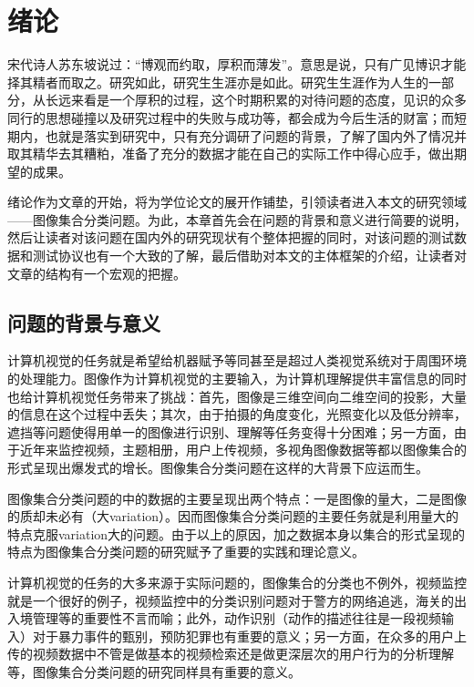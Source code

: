 \chapter{绪\hspace{1em}论}
\label{cha:intro}
宋代诗人苏东坡说过：“博观而约取，厚积而薄发”。意思是说，只有广见博识才能择其精者而取之。研究如此，研究生生涯亦是如此。研究生生涯作为人生的一部分，从长远来看是一个厚积的过程，这个时期积累的对待问题的态度，见识的众多同行的思想碰撞以及研究过程中的失败与成功等，都会成为今后生活的财富；而短期内，也就是落实到研究中，只有充分调研了问题的背景，了解了国内外了情况并取其精华去其糟粕，准备了充分的数据才能在自己的实际工作中得心应手，做出期望的成果。

绪论作为文章的开始，将为学位论文的展开作铺垫，引领读者进入本文的研究领域——图像集合分类问题。为此，本章首先会在问题的背景和意义进行简要的说明，然后让读者对该问题在国内外的研究现状有个整体把握的同时，对该问题的测试数据和测试协议也有一个大致的了解，最后借助对本文的主体框架的介绍，让读者对文章的结构有一个宏观的把握。
\section{问题的背景与意义}
\label{sec:background}
计算机视觉的任务就是希望给机器赋予等同甚至是超过人类视觉系统对于周围环境的处理能力。图像作为计算机视觉的主要输入，为计算机理解提供丰富信息的同时也给计算机视觉任务带来了挑战：首先，图像是三维空间向二维空间的投影，大量的信息在这个过程中丢失；其次，由于拍摄的角度变化，光照变化以及低分辨率，遮挡等问题使得用单一的图像进行识别、理解等任务变得十分困难；另一方面，由于近年来监控视频，主题相册，用户上传视频，多视角图像数据等都以图像集合的形式呈现出爆发式的增长。图像集合分类问题在这样的大背景下应运而生。

图像集合分类问题的中的数据的主要呈现出两个特点：一是图像的量大，二是图像的质却未必有（大variation）。因而图像集合分类问题的主要任务就是利用量大的特点克服variation大的问题。由于以上的原因，加之数据本身以集合的形式呈现的特点为图像集合分类问题的研究赋予了重要的实践和理论意义。

计算机视觉的任务的大多来源于实际问题的，图像集合的分类也不例外，视频监控就是一个很好的例子，视频监控中的分类识别问题对于警方的网络追逃，海关的出入境管理等的重要性不言而喻；此外，动作识别（动作的描述往往是一段视频输入）对于暴力事件的甄别，预防犯罪也有重要的意义；另一方面，在众多的用户上传的视频数据中不管是做基本的视频检索还是做更深层次的用户行为的分析理解等，图像集合分类问题的研究同样具有重要的意义。

